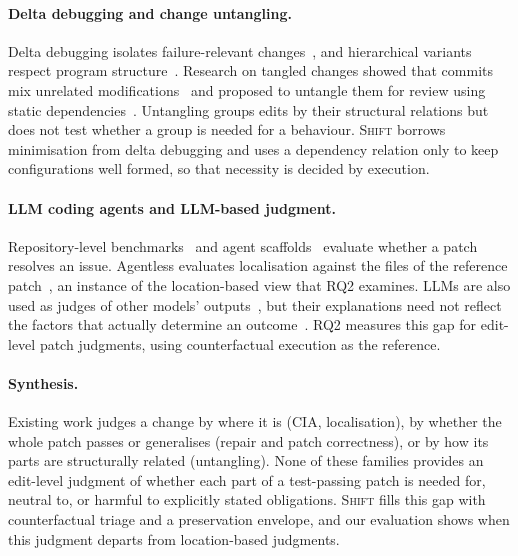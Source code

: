 \documentclass[a4paper,fleqn]{cas-sc}
\newcommand{\tool}{\textsc{Shift}}
\begin{document}
\paragraph{Delta debugging and change untangling.} Delta debugging isolates failure-relevant changes~\citep{zeller1999yesterday,zeller2002ddmin}, and hierarchical variants respect program structure~\citep{misherghi2006hdd}. Research on tangled changes showed that commits mix unrelated modifications~\citep{herzig2013tangled,kirinuki2014tangled} and proposed to untangle them for review using static dependencies~\citep{barnett2015untangle,dias2015untangling}. Untangling groups edits by their structural relations but does not test whether a group is needed for a behaviour. \tool{} borrows minimisation from delta debugging and uses a dependency relation only to keep configurations well formed, so that necessity is decided by execution.

\paragraph{LLM coding agents and LLM-based judgment.} Repository-level benchmarks~\citep{jimenez2024swebench,chowdhury2024verified} and agent scaffolds~\citep{yang2024sweagent,xia2025agentless,miniswe2025} evaluate whether a patch resolves an issue. Agentless evaluates localisation against the files of the reference patch~\citep{xia2025agentless}, an instance of the location-based view that RQ2 examines. LLMs are also used as judges of other models' outputs~\citep{zheng2023judge}, but their explanations need not reflect the factors that actually determine an outcome~\citep{turpin2023unfaithful}. RQ2 measures this gap for edit-level patch judgments, using counterfactual execution as the reference.

\paragraph{Synthesis.} Existing work judges a change by where it is (CIA, localisation), by whether the whole patch passes or generalises (repair and patch correctness), or by how its parts are structurally related (untangling). None of these families provides an edit-level judgment of whether each part of a test-passing patch is needed for, neutral to, or harmful to explicitly stated obligations. \tool{} fills this gap with counterfactual triage and a preservation envelope, and our evaluation shows when this judgment departs from location-based judgments.
\end{document}
